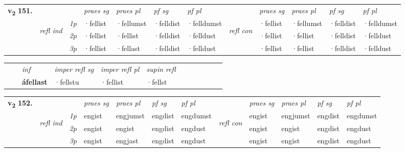 \begin{tabular}{llllllllllll} \toprule
\multirow{4}{*}{{{\textbf{v{\textsubscript{2}}} \Large{\textbf{151.}}}}}  & &   &  \textit{praes sg}  & \textit{praes pl}  &\textit{pf sg} & \textit{pf pl} &  &  \textit{praes sg}  & \textit{praes pl}  & \textit{pf sg} & \textit{pf pl } \\*
	\cmidrule{4-7} \cmidrule{9-12}
 &\multirow{3}{*}{\begin{turn}{90}\textit{refl ind}\end{turn}} & {\textit{1p}} & ·fellist & ·fellumst    & ·felldist & ·felldumst & \multirow{3}{*}{\begin{turn}{90}\textit{refl con}\end{turn}}  &·fellist & ·fellumst & ·felldist & ·felldumst\\*
 &&  {\textit{2p}} &  ·fellist  & ·fellist   & ·felldist & ·felldust & &·fellist & ·fellist & ·felldist & ·felldust \\*
& &  {\textit{3p}} & ·fellist & ·fellast   & ·felldist & ·felldust & & ·fellist & ·fellist& ·felldist & ·felldust  \\*
\cmidrule{4-7} \cmidrule{9-12}
\end{tabular}


\begin{tabular}{llllllllllll}
 & & \textit{inf}   & \textit{imper refl sg} & \textit{imper refl pl}   & \textit{supin refl}      \\*
  & & \textbf{áfellast}    & ·fellstu & ·fellist   & ·fellst  \\*
\cmidrule{1-12}
\end{tabular}



\begin{tabular}{llllllllllll} \toprule
\multirow{4}{*}{{{\textbf{v{\textsubscript{2}}} \Large{\textbf{152.}}}}}  & &   &  \textit{praes sg}  & \textit{praes pl}  &\textit{pf sg} & \textit{pf pl} &  &  \textit{praes sg}  & \textit{praes pl}  & \textit{pf sg} & \textit{pf pl } \\*
	\cmidrule{4-7} \cmidrule{9-12}
 &\multirow{3}{*}{\begin{turn}{90}\textit{refl ind}\end{turn}} & {\textit{1p}} & engist & engjumst    & engdist & engdumst & \multirow{3}{*}{\begin{turn}{90}\textit{refl con}\end{turn}}  &engist & engjumst & engdist & engdumst\\*
 &&  {\textit{2p}} &  engist  & engist   & engdist & engdust & &engist & engist & engdist & engdust \\*
& &  {\textit{3p}} & engist & engjast   & engdist & engdust & & engist & engist& engdist & engdust  \\*
\cmidrule{4-7} \cmidrule{9-12}
\end{tabular}


